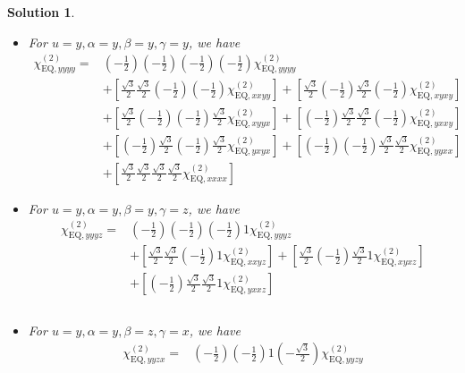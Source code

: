\documentclass[UTF8,10pt,a4paper]{article}
\theoremstyle{Problem}
\theoremstyle{Solution}
\newtheorem*{sol}{Solution}
\begin{document}
\begin{sol}
\begin{itemize}
\item For $u=y,\alpha=y,\beta=y,\gamma=y$, we have
\footnotesize\begin{align}
\nonumber\chi_{\text{EQ},yyyy}^{(2)}=&\left(-\frac{1}{2}\right)\left(-\frac{1}{2}\right)\left(-\frac{1}{2}\right)\left(-\frac{1}{2}\right)\chi_{\text{EQ},yyyy}^{(2)}\\
\nonumber&+\left[\frac{\sqrt{3}}{2}\frac{\sqrt{3}}{2}\left(-\frac{1}{2}\right)\left(-\frac{1}{2}\right)\chi_{\text{EQ},xxyy}^{(2)}\right]+\left[\frac{\sqrt{3}}{2}\left(-\frac{1}{2}\right)\frac{\sqrt{3}}{2}\left(-\frac{1}{2}\right)\chi_{\text{EQ},xyxy}^{(2)}\right]\\
\nonumber&+\left[\frac{\sqrt{3}}{2}\left(-\frac{1}{2}\right)\left(-\frac{1}{2}\right)\frac{\sqrt{3}}{2}\chi_{\text{EQ},xyyx}^{(2)}\right]+\left[\left(-\frac{1}{2}\right)\frac{\sqrt{3}}{2}\frac{\sqrt{3}}{2}\left(-\frac{1}{2}\right)\chi_{\text{EQ},yxxy}^{(2)}\right]\\
\nonumber&+\left[\left(-\frac{1}{2}\right)\frac{\sqrt{3}}{2}\left(-\frac{1}{2}\right)\frac{\sqrt{3}}{2}\chi_{\text{EQ},yxyx}^{(2)}\right]+\left[\left(-\frac{1}{2}\right)\left(-\frac{1}{2}\right)\frac{\sqrt{3}}{2}\frac{\sqrt{3}}{2}\chi_{\text{EQ},yyxx}^{(2)}\right]\\
&+\left[\frac{\sqrt{3}}{2}\frac{\sqrt{3}}{2}\frac{\sqrt{3}}{2}\frac{\sqrt{3}}{2}\chi_{\text{EQ},xxxx}^{(2)}\right]
\end{align}\normalsize
\item For $u=y,\alpha=y,\beta=y,\gamma=z$, we have
\footnotesize\begin{align}
\nonumber\chi_{\text{EQ},yyyz}^{(2)}=&\left(-\frac{1}{2}\right)\left(-\frac{1}{2}\right)\left(-\frac{1}{2}\right)1\chi_{\text{EQ},yyyz}^{(2)}\\
\nonumber&+\left[\frac{\sqrt{3}}{2}\frac{\sqrt{3}}{2}\left(-\frac{1}{2}\right)1\chi_{\text{EQ},xxyz}^{(2)}\right]+\left[\frac{\sqrt{3}}{2}\left(-\frac{1}{2}\right)\frac{\sqrt{3}}{2}1\chi_{\text{EQ},xyxz}^{(2)}\right]\\
\nonumber&+\left[\left(-\frac{1}{2}\right)\frac{\sqrt{3}}{2}\frac{\sqrt{3}}{2}1\chi_{\text{EQ},yxxz}^{(2)}\right]\\
\nonumber&\\
&
\end{align}\normalsize
\item For $u=y,\alpha=y,\beta=z,\gamma=x$, we have
\footnotesize\begin{align}
\nonumber\chi_{\text{EQ},yyzx}^{(2)}=&\left(-\frac{1}{2}\right)\left(-\frac{1}{2}\right)1\left(-\frac{\sqrt{3}}{2}\right)\chi_{\text{EQ},yyzy}^{(2)}\\

\end{align}
\end{itemize}
\end{sol}
\end{document}
